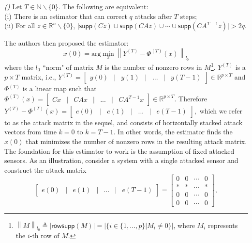 \documentclass[../../thesis.tex]{subfiles}
\newcommand{\norm}[1]{\left\lVert#1\right\rVert}
\begin{document}
\begin{proposition}  \emph{(\hspace{1sp}\cite{Fawzi:2014})}  \label{prop:Fawzi} 
Let $T \in \mathbb{N}  \backslash \{ 0\}$. The following are equivalent:\\
(i) There is an estimator that can correct $q$ attacks after $T$ steps;\\
(ii) For all $z\in \mathbb{R}^n \backslash \{0\}$, $\lvert \textsf{supp}(Cz) \cup \textsf{supp}(CAz) \cup \cdots \cup \textsf{supp}(CA^{T-1} z) \rvert > 2q$.
\end{proposition}
\noindent The authors then proposed the estimator:
\begin{equation}
x(0) = \text{arg} \min_{x} \norm { Y^{(T)} - \Phi ^{(T)} (x) }_{l_0} 
\label{eq:opt_decoder}
\end{equation}
where the $l_0$ ``norm" of matrix $M$ is the number of nonzero rows in $M$\footnote{$\norm{M} _{l_0} \triangleq \lvert \textsf{rowsupp} (M) \rvert = \lvert \{ i \in \{ 1, ... , p\} | M_i \neq 0 \}  \rvert$, where $M_i$ represents the $i$-th row of $M$.}. 
$Y^{(T)}$ is a $p \times T$ matrix, i.e., $Y^{(T)} = \begin{bmatrix} y(0) & \lvert & y(1) & \lvert  & ... & \lvert & y(T-1) \end{bmatrix} \in \mathbb{R}^{p\times T}$ and $\Phi^{(T)}$ is a linear map such that $\Phi ^{(T)} (x) = \begin{bmatrix} Cx  & \lvert & CAx  & \lvert &  ... &  \lvert & CA^{T-1} x \end{bmatrix} \in \mathbb{R}^{p\times T}$. Therefore
$Y^{(T)} - \Phi ^{(T)} (x) =  \begin{bmatrix} e(0)  & \lvert & e(1) & \lvert &  ... &  \lvert & e(T-1) \end{bmatrix},$
which we refer to as the attack matrix in the sequel, and consists of horizontally stacked attack vectors from time $k=0$ to $k=T-1$.
In other words, the estimator finds the $x(0)$ that minimizes the number of nonzero rows in the resulting attack matrix. The foundation for this estimator to work is the assumption of fixed attacked sensors.
As an illustration, consider a system with a single attacked sensor and construct the attack matrix
\begin{equation*}
	\begin{bmatrix} e(0)  & \lvert & e(1) & \lvert &  ... &  \lvert & e(T-1) \end{bmatrix} = \begin{bmatrix} 0 & 0 & \cdots & 0 \\
					       * & * & \cdots & * \\
					       0 & 0 & \cdots & 0 \\
					       0 & 0 & \cdots & 0 
			\end{bmatrix},
\end{equation*} 
\end{document}
